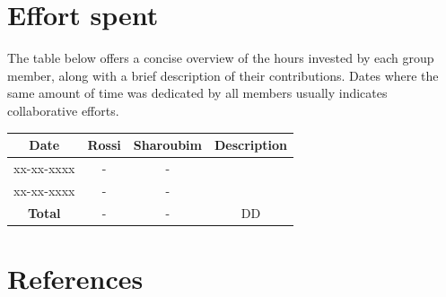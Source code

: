 \documentclass[12pt, a4paper]{report}
\begin{document}
\chapter{Effort spent}
    The table below offers a concise overview of the hours invested by each group member, along with a brief description of their contributions. 
    Dates where the same amount of time was dedicated by all members usually indicates collaborative efforts.
    \begin{table}[H]
        \centering
        \begin{tabular}{cccc}
            \textbf{Date}   & \textbf{Rossi}            & \textbf{Sharoubim}            & \textbf{Description}                          \\ \hline
            xx-xx-xxxx      & -                         & -                             &                                               \\ 
            xx-xx-xxxx      & -                         & -                             &                                               \\ \hline
            \textbf{Total}  & -                         & -                             & DD                                            \\  
        \end{tabular}
    \end{table}

\chapter{References}
\end{document}

